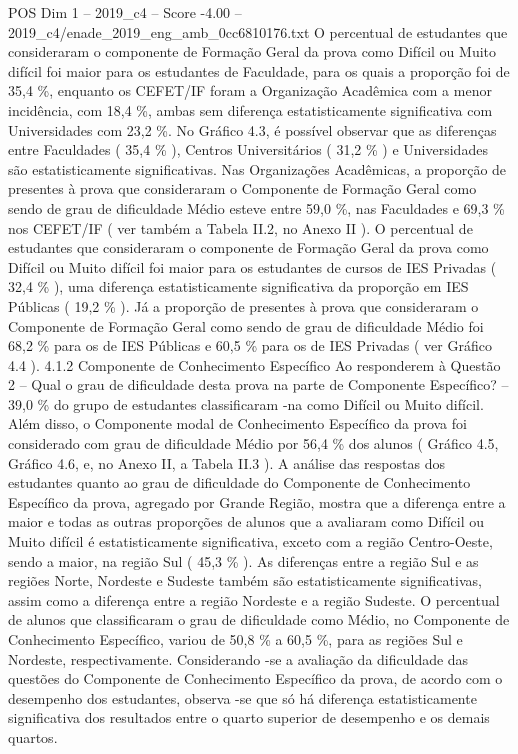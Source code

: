 \begin{textsample}{POS Dim 1 – 2019\_c4 – Score -4.00 – 2019\_c4/enade\_2019\_eng\_amb\_0cc6810176.txt}
O percentual de estudantes que consideraram o componente de Formação Geral da prova como Difícil ou Muito difícil foi maior para os estudantes de Faculdade, para os quais a proporção foi de 35,4 \%, enquanto os CEFET/IF foram a Organização Acadêmica com a menor incidência, com 18,4 \%, ambas sem diferença estatisticamente significativa com Universidades com 23,2 \%.
No Gráfico 4.3, é possível observar que as diferenças entre Faculdades ( 35,4 \% ), Centros Universitários ( 31,2 \% ) e Universidades são estatisticamente significativas.
Nas Organizações Acadêmicas, a proporção de presentes à prova que consideraram o Componente de Formação Geral como sendo de grau de dificuldade Médio esteve entre 59,0 \%, nas Faculdades e 69,3 \% nos CEFET/IF ( ver também a Tabela II.2, no Anexo II ).
O percentual de estudantes que consideraram o componente de Formação Geral da prova como Difícil ou Muito difícil foi maior para os estudantes de cursos de IES Privadas ( 32,4 \% ), uma diferença estatisticamente significativa da proporção em IES Públicas ( 19,2 \% ).
Já a proporção de presentes à prova que consideraram o Componente de Formação Geral como sendo de grau de dificuldade Médio foi 68,2 \% para os de IES Públicas e 60,5 \% para os de IES Privadas ( ver Gráfico 4.4 ). 4.1.2 Componente de Conhecimento Específico Ao responderem à Questão 2 – Qual o grau de dificuldade desta prova na parte de Componente Específico? – 39,0 \% do grupo de estudantes classificaram -na como Difícil ou Muito difícil.
Além disso, o Componente modal de Conhecimento Específico da prova foi considerado com grau de dificuldade Médio por 56,4 \% dos alunos ( Gráfico 4.5, Gráfico 4.6, e, no Anexo II, a Tabela II.3 ).
A análise das respostas dos estudantes quanto ao grau de dificuldade do Componente de Conhecimento Específico da prova, agregado por Grande Região, mostra que a diferença entre a maior e todas as outras proporções de alunos que a avaliaram como Difícil ou Muito difícil é estatisticamente significativa, exceto com a região Centro-Oeste, sendo a maior, na região Sul ( 45,3 \% ).
As diferenças entre a região Sul e as regiões Norte, Nordeste e Sudeste também são estatisticamente significativas, assim como a diferença entre a região Nordeste e a região Sudeste.
O percentual de alunos que classificaram o grau de dificuldade como Médio, no Componente de Conhecimento Específico, variou de 50,8 \% a 60,5 \%, para as regiões Sul e Nordeste, respectivamente.
Considerando -se a avaliação da dificuldade das questões do Componente de Conhecimento Específico da prova, de acordo com o desempenho dos estudantes, observa -se que só há diferença estatisticamente significativa dos resultados entre o quarto superior de desempenho e os demais quartos.

\end{textsample}
